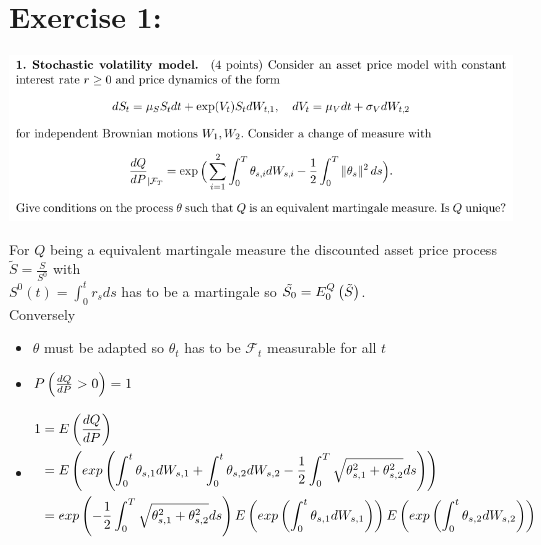 \documentclass[document.tex]{subfiles}
\begin{document}
\section*{Exercise 1:}

\includegraphics[width=\textwidth]{ex1.png}

For $Q$ being a equivalent martingale measure the discounted asset price process $\tilde{S} = \frac{S}{S^0}$ with \\ 
$S^0 (t) = \int_0^t r_s ds $  has to be a martingale so $\tilde{S_0}= E^Q_0 \left( \tilde{S} \right)$.\\
Conversely 
\begin{itemize}
	\item $\theta$ must be adapted so $\theta_t$ has to be  $\mathcal{F}_t$ measurable for all $t$ \\ 
	\item $P \left( \frac{dQ}{dP} > 0 \right) =1 $
	\item 
	\begin{align*} 
		1 &= E \left( \frac{dQ}{dP} \right) \\
		&= E \left( exp \left( \int_0^t \theta_{s,1} dW_{s,1}+ \int_0^t \theta_{s,2} dW_{s,2} - 
		\frac{1}{2} \int_0^T \sqrt{\theta_{s,1}^2+\theta_{s,2}^2 }ds \right) \right) \\ 
		&= exp \left( -\frac{1}{2} \int_0^T \sqrt{\theta_{s,1}^2+\theta_{s,2}^2 }ds \right) 
		E \left( exp \left( \int_0^t \theta_{s,1} dW_{s,1} \right) \right) 
		E \left( exp \left( \int_0^t \theta_{s,2} dW_{s,2} \right) \right)  
		\end{align*}
\end{itemize}
\end{document}
